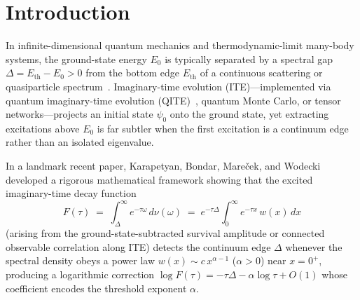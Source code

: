 \documentclass[11pt,a4paper]{article}
\theoremstyle{definition}
\newcommand{\Q}{\mathbb{Q}}
\begin{document}
\begin{abstract}
accuracy gain at $\tau=20$), $L=401$ tight-binding impurity exact diagonalization ($169\times$ gain), 1D van Hove bands ($7{,}630\times$ gain), 6 exact-$\Q$ Hankel certificates ($2.35\times$ tighter than raw $g(\tau_{\max})$ with 200/200 noisy interval soundness), and additive shot-noise scaling.
\end{abstract}

\section{Introduction}
\label{sec:intro}

In infinite-dimensional quantum mechanics and thermodynamic-limit many-body systems, the ground-state energy $E_0$ is typically separated by a spectral gap $\Delta = E_{\mathrm{th}} - E_0 > 0$ from the bottom edge $E_{\mathrm{th}}$ of a continuous scattering or quasiparticle spectrum~\cite{ReedSimon1978IV,Albeverio2005Solvable}. Imaginary-time evolution (ITE)—implemented via quantum imaginary-time evolution (QITE)~\cite{Motta2020QITE}, quantum Monte Carlo, or tensor networks—projects an initial state $\psi_0$ onto the ground state, yet extracting excitations above $E_0$ is far subtler when the first excitation is a continuum edge rather than an isolated eigenvalue.

In a landmark recent paper, Karapetyan, Bondar, Mare\v{c}ek, and Wodecki~\cite{Karapetyan2026Beyond} developed a rigorous mathematical framework showing that the excited imaginary-time decay function
\begin{equation}
  F(\tau) \;=\; \int_{\Delta}^{\infty} e^{-\tau \omega}\, d\nu(\omega)
  \;=\; e^{-\tau \Delta} \int_0^\infty e^{-\tau x}\, w(x)\, dx
  \label{eq:F_def}
\end{equation}
(arising from the ground-state-subtracted survival amplitude or connected observable correlation along ITE) detects the continuum edge $\Delta$ whenever the spectral density obeys a power law $w(x) \sim c\, x^{\alpha - 1}$ ($\alpha > 0$) near $x = 0^+$, producing a logarithmic correction $\log F(\tau) = -\tau \Delta - \alpha \log\tau + O(1)$ whose coefficient encodes the threshold exponent $\alpha$.
\end{document}
